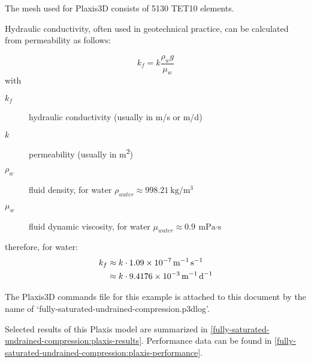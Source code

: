 The mesh used for Plaxis3D consists of 5130 TET10 elements.

Hydraulic conductivity, often used in geotechnical practice, can be calculated
from permeability as follows:

\begin{equation}
    k_f = k \frac{\rho_w g}{\mu_w}
\end{equation}
with
\begin{description}
    \item[$k_f$] hydraulic conductivity (usually in \unit[per-mode = symbol]{\metre\per\second} or \unit[per-mode = symbol]{\metre\per\day})
    \item[$k$] permeability (usually in \unit[per-mode = symbol]{\square\metre})
    \item[$\rho_w$] fluid density, for water $\rho_{water} \approx \SI[per-mode = symbol]{998.21}{\kilogram\per\cubic\metre}$
    \item[$\mu_w$] fluid dynamic viscosity, for water $\mu_{water} \approx \SI{0.9}{\milli\pascal\cdot\second}$
\end{description}

\vspace{1em}

therefore, for water:
\begin{equation}
    \begin{split}
        k_f & \approx k \cdot \qty{1.09E-7}{\per\metre\per\second} \\
            & \approx k \cdot \qty{9.4176E-3}{\per\metre\per\day}
    \end{split}
\end{equation}

The Plaxis3D commands file for this example is attached to this document by the
name of ‘fully-saturated-undrained-compression.p3dlog’.

Selected results of this Plaxis model are summarized in
\autoref{fully-saturated-undrained-compression:plaxis-results}. Performance
data can be found in
\autoref{fully-saturated-undrained-compression:plaxis-performance}.


